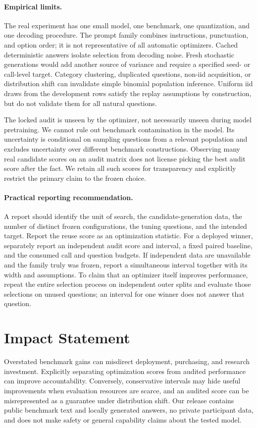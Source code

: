 \documentclass{article}
\begin{document}
\paragraph{Empirical limits.}
The real experiment has one small model, one benchmark, one quantization, and one decoding procedure. The prompt family combines instructions, punctuation, and option order; it is not representative of all automatic optimizers. Cached deterministic answers isolate selection from decoding noise. Fresh stochastic generations would add another source of variance and require a specified seed- or call-level target. Category clustering, duplicated questions, non-iid acquisition, or distribution shift can invalidate simple binomial population inference. Uniform iid draws from the development rows satisfy the replay assumptions by construction, but do not validate them for all natural questions.

The locked audit is unseen by the optimizer, not necessarily unseen during model pretraining. We cannot rule out benchmark contamination in the model. Its uncertainty is conditional on sampling questions from a relevant population and excludes uncertainty over different benchmark constructions. Observing many real candidate scores on an audit matrix does not license picking the best audit score after the fact. We retain all such scores for transparency and explicitly restrict the primary claim to the frozen choice.

\paragraph{Practical reporting recommendation.}
A report should identify the unit of search, the candidate-generation data, the number of distinct frozen configurations, the tuning questions, and the intended target. Report the reuse score as an optimization statistic. For a deployed winner, separately report an independent audit score and interval, a fixed paired baseline, and the consumed call and question budgets. If independent data are unavailable and the family truly was frozen, report a simultaneous interval together with its width and assumptions. To claim that an optimizer itself improves performance, repeat the entire selection process on independent outer splits and evaluate those selections on unused questions; an interval for one winner does not answer that question.

\section*{Impact Statement}
Overstated benchmark gains can misdirect deployment, purchasing, and research investment. Explicitly separating optimization scores from audited performance can improve accountability. Conversely, conservative intervals may hide useful improvements when evaluation resources are scarce, and an audited score can be misrepresented as a guarantee under distribution shift. Our release contains public benchmark text and locally generated answers, no private participant data, and does not make safety or general capability claims about the tested model.
\end{document}
